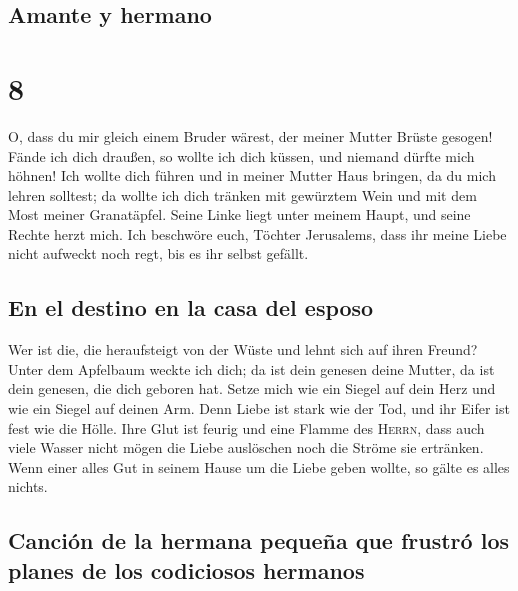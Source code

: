 \hypertarget{amante-y-hermano}{%
\subsection{Amante y hermano}\label{amante-y-hermano}}

\hypertarget{section-7}{%
\section{8}\label{section-7}}

 O, dass du mir gleich einem Bruder wärest, der meiner
Mutter Brüste gesogen! Fände ich dich draußen, so wollte ich dich
küssen, und niemand dürfte mich höhnen!  Ich wollte dich
führen und in meiner Mutter Haus bringen, da du mich lehren solltest; da
wollte ich dich tränken mit gewürztem Wein und mit dem Most meiner
Granatäpfel.  Seine Linke liegt unter meinem Haupt, und
seine Rechte herzt mich.  Ich beschwöre euch, Töchter
Jerusalems, dass ihr meine Liebe nicht aufweckt noch regt, bis es ihr
selbst gefällt.

\hypertarget{en-el-destino-en-la-casa-del-esposo}{%
\subsection{En el destino en la casa del
esposo}\label{en-el-destino-en-la-casa-del-esposo}}

 Wer ist die, die heraufsteigt von der Wüste und lehnt
sich auf ihren Freund? Unter dem Apfelbaum weckte ich dich; da ist dein
genesen deine Mutter, da ist dein genesen, die dich geboren hat.
 Setze mich wie ein Siegel auf dein Herz und wie ein
Siegel auf deinen Arm. Denn Liebe ist stark wie der Tod, und ihr Eifer
ist fest wie die Hölle. Ihre Glut ist feurig und eine Flamme des
\textsc{Herrn},  dass auch viele Wasser nicht mögen die
Liebe auslöschen noch die Ströme sie ertränken. Wenn einer alles Gut in
seinem Hause um die Liebe geben wollte, so gälte es alles nichts.

\hypertarget{canciuxf3n-de-la-hermana-pequeuxf1a-que-frustruxf3-los-planes-de-los-codiciosos-hermanos}{%
\subsection{Canción de la hermana pequeña que frustró los planes de los
codiciosos
hermanos}\label{canciuxf3n-de-la-hermana-pequeuxf1a-que-frustruxf3-los-planes-de-los-codiciosos-hermanos}}

